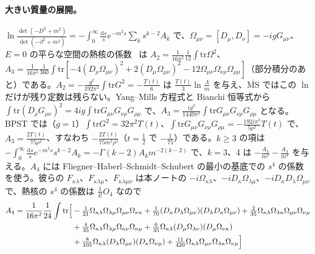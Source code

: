 \documentclass[a4paper,10pt]{ltjsarticle}
\newcommand{\dd}{\mathrm{d}}
\newcommand{\MSbar}{\overline{\mathrm{MS}}}
\newcommand{\tr}{\mathrm{tr}}
\begin{document}
\paragraph{大きい質量の展開。}$\ln\frac{\det(-D^2+m^2)}{\det(-\partial^2+m^2)}=-\int_0^\infty\frac{\dd s}se^{-m^2s}\sum_ks^{k-2}A_k$ で、$\Omega_{\mu\nu}=[D_\mu,D_\nu]=-igG_{\mu\nu}$、$E=0$ の平らな空間の熱核の係数~\cite{vassilevich03} は $A_2=\frac1{16\pi^2}\frac1{12}\int\tr\Omega^2$、$A_3=\frac1{16\pi^2}\frac1{360}\int\tr[-4(D_\rho\Omega_{\mu\nu})^2+2(D_\mu\Omega_{\mu\nu})^2-12\Omega_{\mu\nu}\Omega_{\nu\rho}\Omega_{\rho\mu}]$（部分積分のあと）である。$A_2=-\frac{g^2}{192\pi^2}\int\tr G^2=-\frac{T(t)}6$ は $\frac{T(t)}3\ln\frac{\Lambda}{m}$ を与え、$\MSbar$ ではこの $\ln$ だけが残り定数は残らない。Yang--Mills 方程式と Bianchi 恒等式から $\int\tr(D_\rho G_{\mu\nu})^2=4ig\int\tr G_{\mu\nu}G_{\nu\rho}G_{\rho\mu}$ で、$A_3=\frac{ig^3}{1440\pi^2}\int\tr G_{\mu\nu}G_{\nu\rho}G_{\rho\mu}$ となる。BPST では（$g=1$）$\int\tr G^2=32\pi^2T(t)$、$\int\tr G_{\mu\nu}G_{\nu\rho}G_{\rho\mu}=-\frac{192i\pi^2}{5\rho^2}T(t)$ で、$A_3=\frac{2T(t)}{75\rho^2}$、すなわち $-\frac{2T(t)}{75m^2\rho^2}$（$t=\frac12$ で $-\frac1{75}$）である。$k\ge3$ の項は $-\int_0^\infty\frac{\dd s}se^{-m^2s}s^{k-2}A_k=-\Gamma(k-2)A_km^{-2(k-2)}$ で、$k=3$、4 は $-\frac{A_3}{m^2}-\frac{A_4}{m^4}$ を与える。$A_4$ には Fliegner--Haberl--Schmidt--Schubert の最小の基底での $s^4$ の係数~\cite{fhss98} を使う。彼らの $F_{\kappa\lambda}$、$F_{\kappa\lambda\mu}$、$F_{\kappa\lambda\mu\nu}$ は本ノートの $-i\Omega_{\kappa\lambda}$、$-iD_\kappa\Omega_{\lambda\mu}$、$-iD_\kappa D_\lambda\Omega_{\mu\nu}$ で、熱核の $s^4$ の係数は $\frac1{4!}O_4$ なので
\begin{equation*}
\begin{aligned}
A_4=\frac1{16\pi^2}\frac1{24}\int\tr\Bigl[&-\tfrac1{21}\Omega_{\kappa\lambda}\Omega_{\lambda\mu}\Omega_{\mu\nu}\Omega_{\nu\kappa}+\tfrac1{70}(D_\kappa D_\lambda\Omega_{\mu\nu})(D_\lambda D_\kappa\Omega_{\mu\nu})+\tfrac2{35}\Omega_{\kappa\lambda}\Omega_{\lambda\kappa}\Omega_{\mu\nu}\Omega_{\nu\mu}\\
&+\tfrac4{35}\Omega_{\kappa\lambda}\Omega_{\lambda\mu}\Omega_{\kappa\nu}\Omega_{\nu\mu}+\tfrac6{35}\Omega_{\kappa\lambda}(D_\mu\Omega_{\lambda\nu})(D_\mu\Omega_{\nu\kappa})\\
&+\tfrac8{105}\Omega_{\kappa\lambda}(D_\lambda\Omega_{\mu\nu})(D_\kappa\Omega_{\nu\mu})+\tfrac{11}{420}\Omega_{\kappa\lambda}\Omega_{\mu\nu}\Omega_{\lambda\kappa}\Omega_{\nu\mu}\Bigr]
\end{aligned}
\end{equation*}
\end{document}
